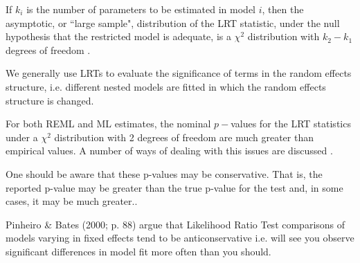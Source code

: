 \documentclass[12pt, a4paper]{report}
\theoremstyle{plain}
\theoremstyle{definition}
\theoremstyle{remark}
\begin{document}
If $k_i$ is the number of parameters to be estimated in model $i$, then the asymptotic, or ``large sample", distribution of the LRT statistic, under the null hypothesis that the restricted model is adequate, is a $\chi^2$ distribution with $k_2-k_1$ degrees of freedom \citep[pg.83]{pb}.

We generally use LRTs to evaluate the significance of terms in the random effects structure, i.e. different nested models are fitted in which the random effects structure is changed.


For both REML and ML estimates, the nominal $p-$values for the LRT statistics under a $\chi^2$ distribution with 2 degrees of freedom are much greater than empirical values. A number of ways of dealing with this issues are discussed \citep[pg.86]{pb}.

One should be aware that these p-values may be conservative. That is, the reported p-value may be greater than the true p-value for the test and, in some cases, it may be much greater.\citep[pg.87]{pb}.



Pinheiro \& Bates (2000; p. 88) argue that Likelihood Ratio Test comparisons of models varying in fixed effects tend to be anticonservative i.e. 
will see you observe significant differences in model fit more often than you should. 



\end{document}
